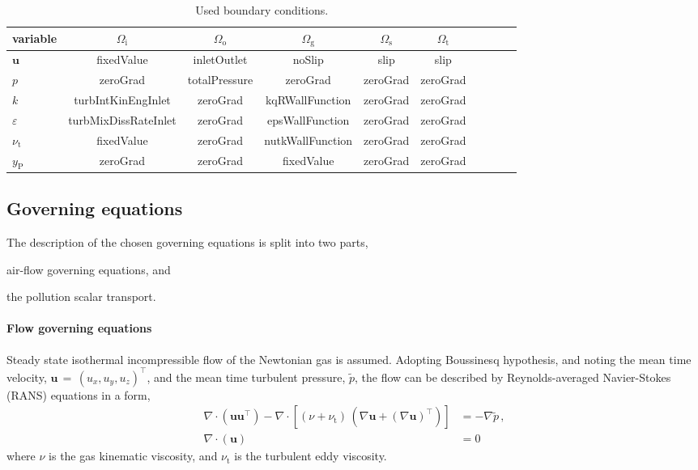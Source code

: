 \begin{table}[htbp]
    \caption{Used boundary conditions.}
    \label{tab:bc}
    \centering
    {
    \begin{tabular}{lccccccccc}
        \hline
        variable & $\Omega_{\mathrm{i}}$ & $\Omega_{\mathrm{o}}$ & $\Omega_{\mathrm{g}}$ &  $\Omega_{\mathrm{s}}$ & $\Omega_{\mathrm{t}}$ \\
        \hline
        $\bm{u}$ & fixedValue & inletOutlet & noSlip & slip & slip\\
        $p$ & zeroGrad & totalPressure & zeroGrad & zeroGrad & zeroGrad\\
        $k$ & turbIntKinEngInlet & zeroGrad & kqRWallFunction & zeroGrad & zeroGrad\\
        $\varepsilon$ & turbMixDissRateInlet & zeroGrad & epsWallFunction & zeroGrad & zeroGrad\\
        $\nu_{\mathrm{t}}$ & fixedValue & zeroGrad & nutkWallFunction & zeroGrad & zeroGrad\\
        $y_{\mathrm{P}}$ & zeroGrad & zeroGrad & fixedValue & zeroGrad & zeroGrad\\
        \hline
    \end{tabular}
    }
\end{table}

\subsection{Governing equations}
\label{subsec:govEq}
The description of the chosen governing equations is split into two parts, 
\begin{inparaenum}[(i)]
    \item air-flow governing equations, and
    \item the pollution scalar transport.
\end{inparaenum}

\paragraph{Flow governing equations} Steady state isothermal incompressible flow of the Newtonian gas is assumed. Adopting Boussinesq hypothesis, and noting the mean time velocity, $\bm{u}\,=\,(u_x,u_y,u_z)^\intercal$, and the mean time turbulent pressure, $\tilde{p}$, the flow can be described by Reynolds-averaged Navier-Stokes (RANS) equations in a form,
\begin{align}
    \label{eq:RANS1}
    \nabla\cdot(\bm{u}\bm{u}^\intercal) - \nabla\cdot\left[(\nu + \nu_{\mathrm{t}})\,(\nabla \bm{u} + (\nabla\bm{u})^\intercal)\right] &= - \nabla \tilde{p}\,,\\
    \label{eq:RANS2}
    \nabla\cdot(\bm{u}) &= 0\,
\end{align}
where $\nu$ is the gas kinematic viscosity, and $\nu_{\mathrm{t}}$ is the turbulent eddy viscosity.

